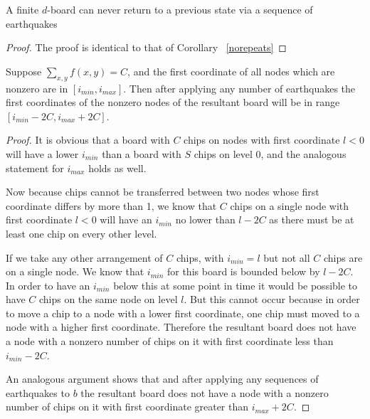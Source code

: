\documentclass[runningheads,a4paper]{llncs}
\begin{document}
\begin{lemma}
A finite $d$-board can never return to a previous state via a sequence of earthquakes
\end{lemma}
\begin{proof}
The proof is identical to that of Corollary ~\ref{norepeats}
\end{proof}

\begin{lemma}
\label{finiteextensiontree}
Suppose $\sum_{x,y} f(x,y) = C$, and the first coordinate of all nodes which are nonzero are in $[i_{min}, i_{max}]$. Then after applying any number of earthquakes the first coordinates of the nonzero nodes of the resultant board will be in range $[i_{min} - 2C, i_{max} + 2C]$.
\end{lemma}

\begin{proof}
It is obvious that a board with $C$ chips on nodes with first coordinate $l<0$ will have a lower $i_{min}$ than a board with $S$ chips on level 0, and the analogous statement for $i_{max}$ holds as well. 

Now because chips cannot be transferred between two nodes whose first coordinate differs by more than 1, we know that $C$ chips on a single node with first coordinate $l<0$ will have an $i_{min}$ no lower than $l-2C$ as there must be at least one chip on every other level. 

If we take any other arrangement of $C$ chips, with $i_{min}=l$ but not all $C$ chips are on a single node. We know that $i_{min}$ for this board is bounded below by $l-2C$. In order to have an $i_{min}$ below this at some point in time it would be possible to have $C$ chips on the same node on level $l$. But this cannot occur because in order to move a chip to a node with a lower first coordinate, one chip must moved to a node with a higher first coordinate. Therefore the resultant board does not have a node with a nonzero number of chips on it with first coordinate less than $i_{min} -2C$.

An analogous argument shows that  and after applying any sequences of earthquakes to $b$ the resultant board does not have a node with a nonzero number of chips on it with first coordinate greater than $i_{max}+2C$.
\end{proof}
\end{document}
